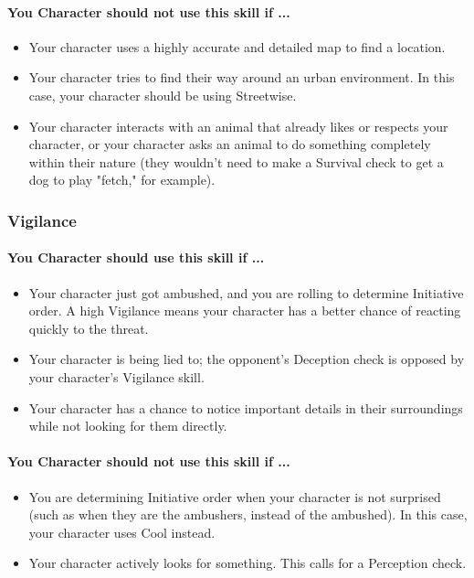 \begin{multicols}{2}
\paragraph{You Character should not use this skill if ...}
\begin{itemize}
    \item Your character uses a highly accurate and detailed map to find a location.
    \item Your character tries to find their way around an urban environment. In
        this case, your character should be using Streetwise.
    \item Your character interacts with an animal that already likes or respects
        your character, or your character asks an animal to do something completely
        within their nature (they wouldn't need to make a Survival check to get a
        dog to play "fetch," for example).
\end{itemize}

\subsubsection{Vigilance}\label{skill:vigilance}
\paragraph{You Character should use this skill if ...}
\begin{itemize}
    \item Your character just got ambushed, and you are rolling to determine
        Initiative order. A high Vigilance means your character has a better chance
        of reacting quickly to the threat.
    \item Your character is being lied to; the opponent's Deception check is opposed
        by your character's Vigilance skill.
    \item Your character has a chance to notice important details in their
        surroundings while not looking for them directly.
\end{itemize}
\paragraph{You Character should not use this skill if ...}
\begin{itemize}
    \item You are determining Initiative order when your character is not surprised
        (such as when they are the ambushers, instead of the ambushed). In this
        case, your character uses Cool instead.
    \item Your character actively looks for something. This calls for a Perception
        check.
\end{itemize}

\end{multicols}

